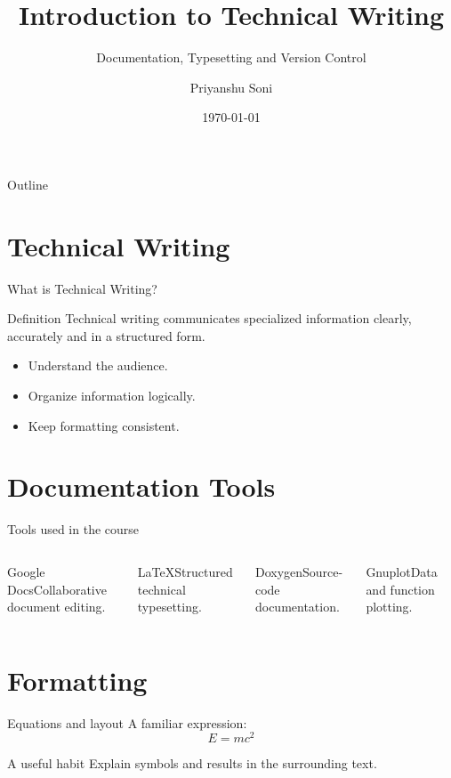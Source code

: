 \documentclass[aspectratio=169]{beamer}
\title{Introduction to Technical Writing}
\subtitle{Documentation, Typesetting and Version Control}
\author{Priyanshu Soni}
\institute{MNIT Jaipur}
\date{\today}
\begin{document}
\begin{frame}\titlepage\end{frame}
\begin{frame}{Outline}\tableofcontents\end{frame}
\section{Technical Writing}
\begin{frame}{What is Technical Writing?}
\begin{block}{Definition}
Technical writing communicates specialized information clearly, accurately and in a structured form.
\end{block}
\begin{itemize}
\item Understand the audience.
\item Organize information logically.
\item Keep formatting consistent.
\end{itemize}
\end{frame}
\section{Documentation Tools}
\begin{frame}{Tools used in the course}
\begin{columns}[T]
\begin{block}{Google Docs}Collaborative document editing.\end{block}
\begin{block}{LaTeX}Structured technical typesetting.\end{block}
\begin{block}{Doxygen}Source-code documentation.\end{block}
\begin{block}{Gnuplot}Data and function plotting.\end{block}
\end{columns}
\end{frame}
\section{Formatting}
\begin{frame}{Equations and layout}
A familiar expression:
\[E=mc^2\]
\begin{alertblock}{A useful habit}
Explain symbols and results in the surrounding text.
\end{alertblock}
\end{frame}
\end{document}
